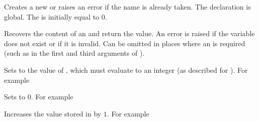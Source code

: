 \documentclass[oneside]{book}
\let\tn=\cs
\begin{document}
\begin{function}{\IntNew}
\begin{syntax}
 
\end{syntax}
Creates a new  or raises an error if the name is
already taken. The declaration is global. The  is
initially equal to $0$.
\end{function}

\begin{function}{\IntUse}
\begin{syntax}
 
\end{syntax}
Recovers the content of an  and return the value.
An error is raised if the variable does
not exist or if it is invalid. Can be omitted in places where an
 is required (such as in the first and third arguments
of ).%
\end{function}

\begin{function}{\IntSet}
\begin{syntax}
  
\end{syntax}
Sets  to the value of ,
which must evaluate to an integer (as described for ).
For example
\begin{demo}
\IntSet{}
\IntUse\lTmpaInt
\end{demo}
\end{function}

\begin{function}{\IntZero}
\begin{syntax}
 
\end{syntax}
Sets  to $0$. For example
\begin{demo}
\IntSet{}
\IntZero\lTmpaInt
\IntUse\lTmpaInt
\end{demo}
\end{function}

\begin{function}{\IntIncr}
\begin{syntax}
 
\end{syntax}
Increases the value stored in  by $1$.
For example
\begin{demo}
\IntSet{}
\IntIncr\lTmpaInt
\IntUse\lTmpaInt
\end{demo}
\end{function}
\end{document}
